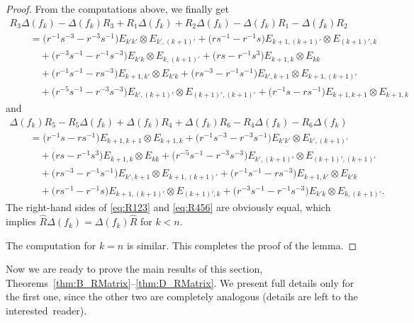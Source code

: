 \documentclass[pdftex]{sigma}
\numberwithin{equation}{section}
\begin{document}
\begin{proof}
From the computations above, we finally get
\begin{gather}
 R_{3}\Delta(f_{k}) - \Delta(f_{k})R_{3} + R_{1}\Delta(f_{k}) + R_{2}\Delta(f_{k}) - \Delta(f_{k})R_{1} - \Delta(f_{k})R_{2} \label{eq:R123}\\
 \qquad{}= \bigl(r^{-1}s^{-3} - r^{-3}s^{-1}\bigr)E_{k'k'} \otimes E_{k',(k+1)'} + \bigl(rs^{-1} - r^{-1}s\bigr)E_{k + 1,(k + 1)'} \otimes E_{(k + 1)',k} \nonumber\\
 \quad\qquad{} + \bigl(r^{-3}s^{-1} - r^{-1}s^{-3}\bigr)E_{k'k} \otimes E_{k,(k + 1)'} + \bigl(rs - r^{-1}s^{3}\bigr)E_{k + 1,k} \otimes E_{kk} \nonumber\\
 \quad\qquad{} + \bigl(r^{-1}s^{-1} - rs^{-3}\bigr)E_{k + 1,k'} \otimes E_{k'k} + \bigl(rs^{-3} - r^{-1}s^{-1}\bigr)E_{k',k + 1} \otimes E_{k + 1,(k + 1)'} \nonumber\\
 \quad\qquad{} + \bigl(r^{-5}s^{-1} - r^{-3}s^{-3}\bigr)E_{k',(k + 1)'} \otimes E_{(k + 1)',(k + 1)'} + \bigl(r^{-1}s - rs^{-1}\bigr)E_{k + 1,k + 1} \otimes E_{k + 1,k}\nonumber
\end{gather}
and
\begin{gather}
 \Delta(f_{k})R_{5} - R_{5}\Delta(f_{k}) + \Delta(f_{k})R_{4} + \Delta(f_{k})R_{6} - R_{4}\Delta(f_{k}) - R_{6}\Delta(f_{k})\label{eq:R456}\\
 \qquad{}=\bigl(r^{-1}s - rs^{-1}\bigr)E_{k + 1,k + 1} \otimes E_{k + 1,k} +\bigl(r^{-1}s^{-3} - r^{-3}s^{-1}\bigr)E_{k'k'} \otimes E_{k',(k + 1)'} \nonumber\\
 \quad\qquad{} + \bigl(rs - r^{-1}s^{3}\bigr)E_{k + 1,k} \otimes E_{kk} + \bigl(r^{-5}s^{-1} - r^{-3}s^{-3}\bigr)E_{k',(k + 1)'} \otimes E_{(k + 1)',(k + 1)'}\nonumber \\
 \quad\qquad{} + \bigl(rs^{-3} - r^{-1}s^{-1}\bigr)E_{k',k + 1} \otimes E_{k + 1,(k + 1)'} + \bigl(r^{-1}s^{-1} - rs^{-3}\bigr)E_{k + 1,k'} \otimes E_{k'k}\nonumber \\
 \quad\qquad{} + \bigl(rs^{-1} - r^{-1}s\bigr)E_{k + 1,(k + 1)'} \otimes E_{(k + 1)',k} + \bigl(r^{-3}s^{-1} - r^{-1}s^{-3}\bigr)E_{k'k} \otimes E_{k,(k + 1)'}.\nonumber
\end{gather}
The right-hand sides of \eqref{eq:R123} and \eqref{eq:R456} are obviously equal, which implies $\hat{R}\Delta(f_{k}) = \Delta(f_{k})\hat{R}$ for $k < n$.

The computation for $k = n$ is similar. This completes the proof of the lemma.
\end{proof}


Now we are ready to prove the main results of this section, Theorems~\ref{thm:B_RMatrix}--\ref{thm:D_RMatrix}. We present full details only for the first one, since the other two are completely analogous (details are left to the interested~reader).
\end{document}
